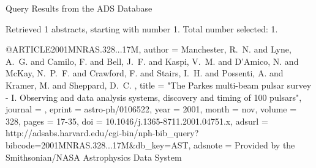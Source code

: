 Query Results from the ADS Database


Retrieved 1 abstracts, starting with number 1.  Total number selected: 1.

@ARTICLE{2001MNRAS.328...17M,
   author = {{Manchester}, R.~N. and {Lyne}, A.~G. and {Camilo}, F. and {Bell}, J.~F. and 
	{Kaspi}, V.~M. and {D'Amico}, N. and {McKay}, N.~P.~F. and {Crawford}, F. and 
	{Stairs}, I.~H. and {Possenti}, A. and {Kramer}, M. and {Sheppard}, D.~C.
	},
    title = "{The Parkes multi-beam pulsar survey - I. Observing and data analysis systems, discovery and timing of 100 pulsars}",
  journal = {\mnras},
   eprint = {astro-ph/0106522},
     year = 2001,
    month = nov,
   volume = 328,
    pages = {17-35},
      doi = {10.1046/j.1365-8711.2001.04751.x},
   adsurl = {http://adsabs.harvard.edu/cgi-bin/nph-bib_query?bibcode=2001MNRAS.328...17M&db_key=AST},
  adsnote = {Provided by the Smithsonian/NASA Astrophysics Data System}
}



